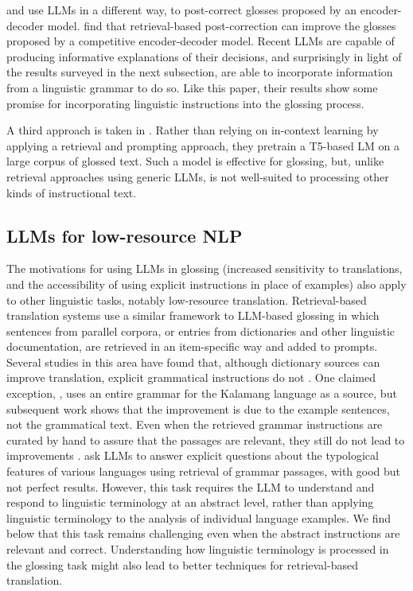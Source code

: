 \citet{yang-etal-2024-multiple} and \citet{shandilya-palmer-2025-boosting} use LLMs in a different way, to post-correct glosses proposed by an encoder-decoder model. \citet{shandilya-palmer-2025-boosting} find that retrieval-based post-correction can improve the glosses proposed by a competitive encoder-decoder model. Recent LLMs are capable of producing informative explanations of their decisions, and surprisingly in light of the results surveyed in the next subsection, are able to incorporate information from a linguistic grammar to do so. Like this paper, their results show some promise for incorporating linguistic instructions into the glossing process.

A third approach is taken in \citet{ginn-etal-2024-glosslm}. Rather than relying on in-context learning by applying a retrieval and prompting approach, they pretrain a T5-based LM on a large corpus of glossed text. Such a model is effective for glossing, but, unlike retrieval approaches using generic LLMs, is not well-suited to processing other kinds of instructional text.

\subsection{LLMs for low-resource NLP}

The motivations for using LLMs in glossing (increased sensitivity to translations, and the accessibility of using explicit instructions in place of examples) also apply to other linguistic tasks, notably low-resource translation. Retrieval-based translation systems use a similar framework to LLM-based glossing in which sentences from parallel corpora, or entries from dictionaries and other linguistic documentation, are retrieved in an item-specific way and added to prompts. Several studies in this area have found that, although dictionary sources can improve translation, explicit grammatical instructions do not \cite{court-elsner-2024-shortcomings,zhang2024teaching,elsner-needle-2023}. One claimed exception, \citet{reid2024gemini}, uses an entire grammar for the Kalamang language as a source, but subsequent work \cite{aycock2024llmsreallylearntranslate} shows that the improvement is due to the example sentences, not the grammatical text. Even when the retrieved grammar instructions are curated by hand to assure that the passages are relevant, they still do not lead to improvements \cite{court-elsner-2024-shortcomings}. \citet{kornilov2024classification} ask LLMs to answer explicit questions about the typological features of various languages using retrieval of grammar passages, with good but not perfect results. However, this task requires the LLM to understand and respond to linguistic terminology at an abstract level, rather than applying linguistic terminology to the analysis of individual language examples. We find below that this task remains challenging even when the abstract instructions are relevant and correct. Understanding how linguistic terminology is processed in the glossing task might also lead to better techniques for retrieval-based translation.

